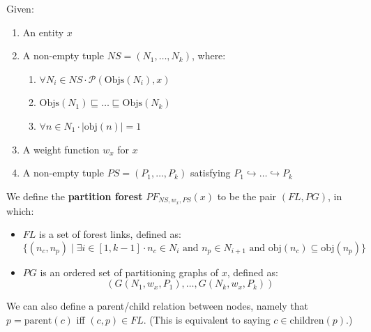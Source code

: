 \begin{definition}
Given:

\begin{enumerate}

\item An entity $x$
\item A non-empty tuple $\textit{NS} = (N_1,\ldots,N_k)$, where:

\begin{enumerate}

\item $\forall N_i \in \textit{NS} \cdot \mathcal{P}(\mbox{Objs}(N_i),x)$
\item $\mbox{Objs}(N_1) \sqsubseteq \ldots \sqsubseteq \mbox{Objs}(N_k)$ 
\item $\forall n \in N_1 \cdot |\mbox{obj}(n)| = 1$

\end{enumerate}

\item A weight function $w_x$ for $x$
\item A non-empty tuple $\textit{PS} = (P_1,\ldots,P_k)$ satisfying $P_1 \hookrightarrow \ldots \hookrightarrow P_k$

\end{enumerate}

\noindent We define the \textbf{partition forest} $PF_{\textit{NS},w_x,\textit{PS}}(x)$ to be the pair $(\textit{FL},\textit{PG})$, in which:

\begin{itemize}

\item $\textit{FL}$ is a set of forest links, defined as:
%
\[
\{(n_c,n_p) \; | \; \exists i \in [1,k-1] \cdot n_c \in N_i \mbox { and } n_p \in N_{i+1} \mbox{ and } \mbox{obj}(n_c) \subseteq \mbox{obj}(n_p)\}
\]

\item $\textit{PG}$ is an ordered set of partitioning graphs of $x$, defined as:
%
\[
(G(N_1,w_x,P_1),\ldots,G(N_k,w_x,P_k))
\]

\end{itemize}

\end{definition}

\noindent We can also define a parent/child relation between nodes, namely that $p = \mbox{parent}(c)$ iff $(c,p) \in \textit{FL}$. (This is equivalent to saying $c \in \mbox{children}(p)$.)


